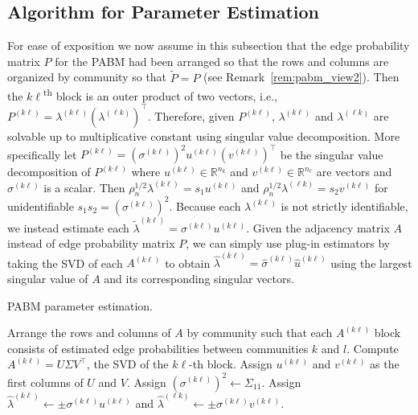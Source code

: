 \documentclass[12pt]{article}
\begin{document}
\hypertarget{parameter-estimation}{%
\subsection{Algorithm for Parameter Estimation}\label{parameter-estimation}}
For ease of exposition we now assume in this subsection that the
edge probability matrix \(P\) for the PABM had been arranged so that the rows
and columns are organized by community so that $\tilde{P} = P$ (see
Remark~\ref{rem:pabm_view2}). Then the \(k\ell\)\textsuperscript{th}
block is an outer product of two vectors, i.e.,
\(P^{(k \ell)} = \lambda^{(k \ell)} (\lambda^{(\ell k)})^\top\). Therefore, given
\(P^{(k \ell)}\), \(\lambda^{(k \ell)}\) and \(\lambda^{(\ell k)}\) are solvable
up to multiplicative constant using singular value
decomposition. More specifically 
let \(P^{(k \ell)} = (\sigma^{(k \ell)})^2 u^{(k \ell)} (v^{(k \ell)})^\top\)
be the singular value decomposition of \(P^{(k \ell)}\) where
\(u^{(k \ell)} \in \mathbb{R}^{n_k}\) and 
\(v^{(k \ell)} \in \mathbb{R}^{n_\ell}\) are vectors
and \(\sigma^{(k \ell)}\) is a scalar. 
Then \(\rho_n^{1/2} \lambda^{(k \ell)} = s_1 u^{(k \ell)}\)
and \(\rho_n^{1/2} \lambda^{(\ell k)} = s_2 v^{(k \ell)}\) 
for unidentifiable $s_1 s_2 = (\sigma^{(k \ell)})^2$.
Because each $\lambda^{(k \ell)}$ is not strictly identifiable,
we instead estimate each 
$\tilde{\lambda}^{(k \ell)} = \sigma^{(k \ell)} u^{(k \ell)}$. 
Given the adjacency matrix \(A\)
instead of edge probability matrix \(P\), we can simply use plug-in
estimators by taking the SVD of each $A^{(k \ell)}$ to obtain 
$\hat{\lambda}^{(k \ell)} = \hat{\sigma}^{(k \ell)} \hat{u}^{(k \ell)}$ 
using the largest singular value of $A$ and its corresponding singular vectors. 

\begin{algorithm}[tp]
  \label{alg:param_est}
  \DontPrintSemicolon
  \SetAlgoLined
  \caption{PABM parameter estimation.}
  Arrange the rows and columns of $A$ by community such that each 
  $A^{(k \ell)}$ block consists of estimated edge probabilities between 
  communities $k$ and $l$.\;
   {
    Compute $A^{(k \ell)} = U \Sigma V^\top$, the SVD of the $k\ell$-th 
    block.\;
    Assign $u^{(k \ell)}$ and $v^{(k \ell)}$ as the first columns of $U$ and $V$. 
    Assign $(\sigma^{(k \ell)})^2 \leftarrow \Sigma_{11}$.\;
    Assign $\hat{\lambda}^{(k \ell)} \leftarrow \pm \sigma^{(k \ell)} u^{(k \ell)}$ and 
    $\hat{\lambda}^{(\ell k)} \leftarrow \pm \sigma^{(k \ell)} v^{(k \ell)}$.
  }
\end{algorithm}
\end{document}
